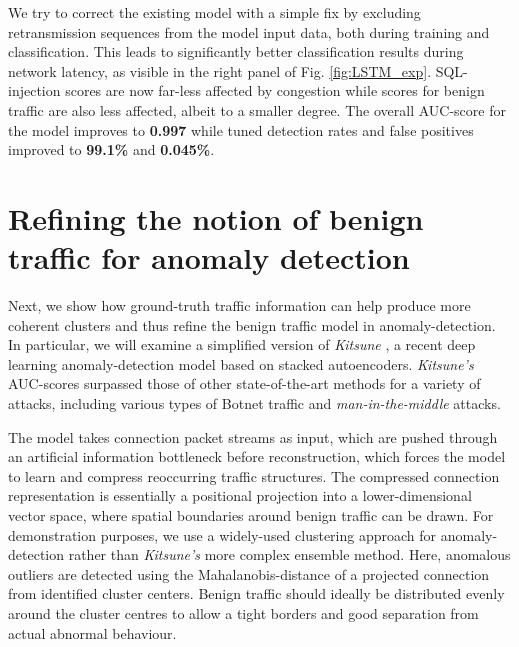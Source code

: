 \documentclass[runningheads]{llncs}
\begin{document}
We try to correct the existing model with a simple fix by excluding retransmission sequences from the model input data, both during training and classification. This leads to significantly better classification results during network latency, as visible in the right panel of Fig. \ref{fig:LSTM_exp}. SQL-injection scores are now far-less affected by congestion while scores for benign traffic are also less affected, albeit to a smaller degree.
The overall AUC-score for the model improves to \textbf{0.997} while tuned detection rates and false positives improved to \textbf{99.1\%} and \textbf{0.045\%}.


\section{Refining the notion of benign traffic for anomaly detection}\label{Sec:Refining}

Next, we show how ground-truth traffic information can help produce more coherent clusters and thus refine the benign traffic model in anomaly-detection. In particular, we will examine a 
simplified version of \textit{Kitsune} \cite{mirsky2018kitsune}, a recent deep learning anomaly-detection model based on stacked autoencoders. \textit{Kitsune's} AUC-scores surpassed those of other state-of-the-art methods for a variety of attacks, including various types of Botnet traffic and \textit{man-in-the-middle} attacks.

The model takes connection packet streams as input, which are pushed through an artificial information bottleneck before reconstruction, which forces the model to learn and compress reoccurring traffic structures. The compressed connection representation is essentially a positional projection into a lower-dimensional vector space, where spatial boundaries around benign traffic can be drawn. For demonstration purposes, we use a widely-used clustering approach for anomaly-detection rather than \textit{Kitsune's} more complex ensemble method. 
Here, anomalous outliers are detected using the Mahalanobis-distance of a projected connection from identified cluster centers. %
Benign traffic should ideally be distributed evenly around the cluster centres to allow a tight borders and good separation from actual abnormal behaviour.
\end{document}
